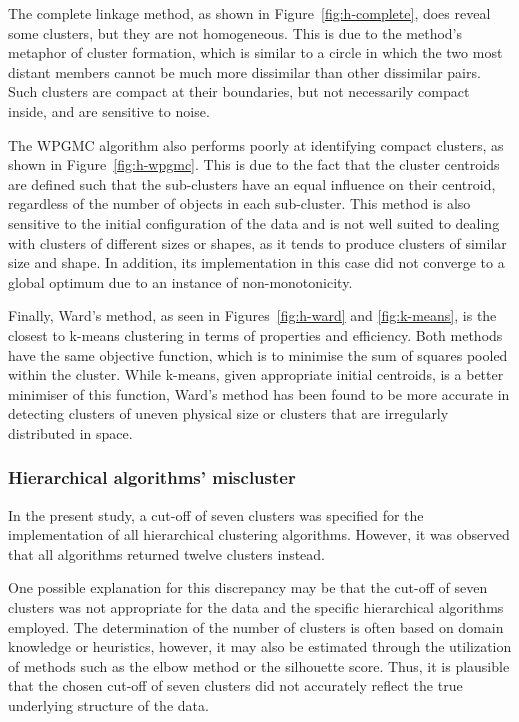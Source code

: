 \documentclass[
  course = {{DS12E Clustering Algorithms}},
  quartile = {{2}},
  assignment = ,
  name = {{Michael Darmanis ; Vasilios Venieris}},
  studentnumber = {{7115152200004 ; 7115152200017}},
  email = {{mdarm@di.uoa.gr ; vvenieris@di.uoa.gr}},
  firstexercise = 1
]{aga-homework}
\begin{document}
The complete linkage method, as shown in Figure~\ref{fig:h-complete}, does reveal some clusters, but they are not homogeneous. This is due to the method's metaphor of cluster formation, which is similar to a circle in which the two most distant members cannot be much more dissimilar than other dissimilar pairs. Such clusters are compact at their boundaries, but not necessarily compact inside, and are sensitive to noise.

The WPGMC algorithm also performs poorly at identifying compact clusters, as shown in Figure~\ref{fig:h-wpgmc}. This is due to the fact that the cluster centroids are defined such that the sub-clusters have an equal influence on their centroid, regardless of the number of objects in each sub-cluster. This method is also sensitive to the initial configuration of the data and is not well suited to dealing with clusters of different sizes or shapes, as it tends to produce clusters of similar size and shape. In addition, its implementation in this case did not converge to a global optimum due to an instance of non-monotonicity.

Finally, Ward's method, as seen in Figures~\ref{fig:h-ward} and \ref{fig:k-means}, is the closest to k-means clustering in terms of properties and efficiency. Both methods have the same objective function, which is to minimise the sum of squares pooled within the cluster. While k-means, given appropriate initial centroids, is a better minimiser of this function, Ward's method has been found to be more accurate in detecting clusters of uneven physical size or clusters that are irregularly distributed in space.

\subsubsection{Hierarchical algorithms' miscluster}

In the present study, a cut-off of seven clusters was specified for the implementation of all hierarchical clustering algorithms. However, it was observed that all algorithms returned twelve clusters instead.

One possible explanation for this discrepancy may be that the cut-off of seven clusters was not appropriate for the data and the specific hierarchical algorithms employed. The determination of the number of clusters is often based on domain knowledge or heuristics, however, it may also be estimated through the utilization of methods such as the elbow method or the silhouette score. Thus, it is plausible that the chosen cut-off of seven clusters did not accurately reflect the true underlying structure of the data.
\end{document}
